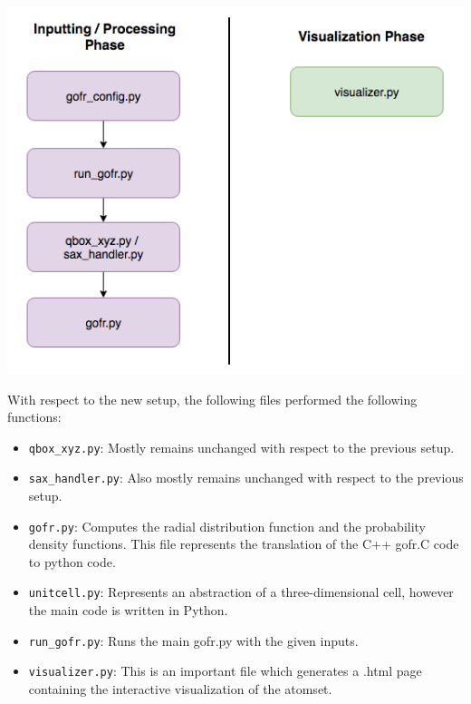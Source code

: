 \includegraphics[scale=0.60]{images/new_pipeline}\newline




With respect to the new setup, the following files performed the following functions: 

\begin{itemize}
        
    \item \verb|qbox_xyz.py|: Mostly remains unchanged with respect to the previous setup.
    
    \item \verb|sax_handler.py|: Also mostly remains unchanged with respect to the previous setup.

    \item \verb|gofr.py|: Computes the radial distribution function and the probability density functions. This file represents the translation of the C++ gofr.C code to python code. 
    
    \item \verb|unitcell.py|: Represents an abstraction of a three-dimensional cell, however the main code is written in Python.
    
    \item \verb|run_gofr.py|: Runs the main gofr.py with the given inputs.

    \item \verb|visualizer.py|: This is an important file which generates a .html page containing the interactive visualization of the atomset.
    
\end{itemize}



